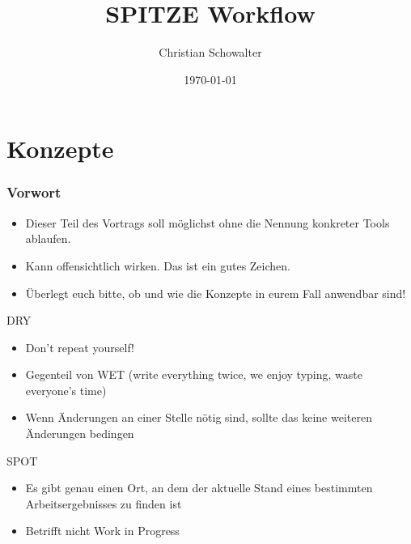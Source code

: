 \documentclass{beamer}
\title{SPITZE Workflow}
\author{Christian Schowalter}
\date{\today}
\begin{document}
\maketitle

\section{Konzepte}
\begin{frame} %
  \frametitle{Vorwort}
  \begin{Definition}
  	\begin{itemize}
  	\item Dieser Teil des Vortrags soll möglichst ohne die Nennung konkreter Tools ablaufen.
    \item Kann offensichtlich wirken. Das ist ein gutes Zeichen.
    \item Überlegt euch bitte, ob und wie die Konzepte in eurem Fall anwendbar sind!
    \end{itemize}
  \end{Definition}
\end{frame}

\begin{frame}
	\begin{block}{DRY}
		\begin{itemize}
			\item Don’t repeat yourself!
			\item Gegenteil von WET (\glqq write everything twice\grqq , \glqq we enjoy typing\grqq , \glqq waste everyone’s time\grqq)
			\item Wenn Änderungen an einer Stelle nötig sind, sollte das keine weiteren Änderungen bedingen
		\end{itemize}
	\end{block}
\end{frame}

\begin{frame}
	\begin{block}{SPOT}
		\begin{itemize}
			\item Es gibt genau einen Ort, an dem der aktuelle Stand eines bestimmten Arbeitsergebnisses zu finden ist
			\item Betrifft nicht Work in Progress
		\end{itemize}
	\end{block}
\end{frame}
\end{document}
